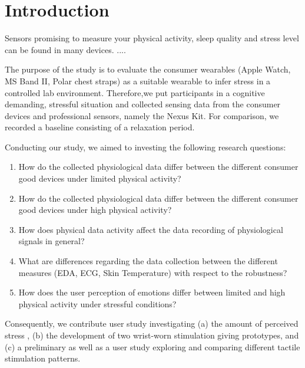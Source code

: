 \section{Introduction}

Sensors promising to measure your physical activity, sleep quality and stress level can be found in many devices. ....  





The purpose of the study is to evaluate the consumer wearables (Apple Watch, MS Band II, Polar chest straps) as a suitable wearable to infer stress in a controlled lab environment. Therefore,we put participants in a cognitive demanding, stressful situation and collected sensing data from the consumer devices and professional sensors, namely the Nexus Kit. For comparison, we recorded a baseline consisting of a relaxation period. 

Conducting our study, we aimed to investing the following research questions:
\begin{enumerate}
	\item How do the collected physiological data differ between the different consumer good devices under limited physical activity?
	\item How do the collected physiological data differ between the different consumer good devices under high physical activity?
	\item How does physical data activity affect the data recording of physiological signals in general? 
	\item What are differences regarding the data collection between the different measures (EDA, ECG, Skin Temperature) with respect to the robustness?
	\item How does the user perception of emotions differ between limited and high physical activity under stressful conditions?  
\end{enumerate}

Consequently, we contribute user study investigating (a) the amount of perceived stress , (b) the development of two wrist-worn stimulation giving prototypes, and (c) a preliminary as well as a user study exploring and comparing different tactile stimulation patterns.


 


